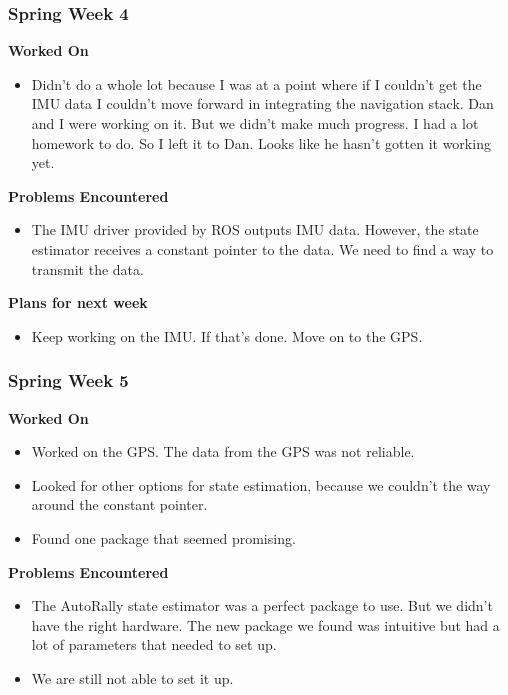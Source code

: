\documentclass[compsoc,draftclsnofoot,onecolumn,10pt]{IEEEtran}
\begin{document}
\subsubsection*{Spring Week 4}
\textbf{Worked On}
\begin{itemize}
  \item Didn't do a whole lot because I was at a point where if I couldn't
  get the IMU data I couldn't move forward in integrating the navigation
  stack. Dan and I were working on it. But we didn't make much progress.
  I had a lot homework to do. So I left it to Dan. Looks like he hasn't
  gotten it working yet.
\end{itemize}

\textbf{Problems Encountered}
\begin{itemize}
  \item The IMU driver provided by ROS outputs IMU data. However, the state
  estimator receives a constant pointer to the data. We need to find a way to
  transmit the data.
\end{itemize}

\textbf{Plans for next week}
\begin{itemize}
  \item Keep working on the IMU. If that's done. Move on to the GPS.
\end{itemize}


\subsubsection*{Spring Week 5}

\textbf{Worked On}
\begin{itemize}
  \item Worked on the GPS. The data from the GPS was not reliable.
  \item Looked for other options for state estimation, because we
  couldn't the way around the constant pointer.
  \item Found one package that seemed promising.
\end{itemize}

\textbf{Problems Encountered}
\begin{itemize}
  \item The AutoRally state estimator was a perfect package to use. But
  we didn't have the right hardware. The new package we found was intuitive
  but had a lot of parameters that needed to set up.
  \item We are still not able to set it up.
\end{itemize}
\end{document}
